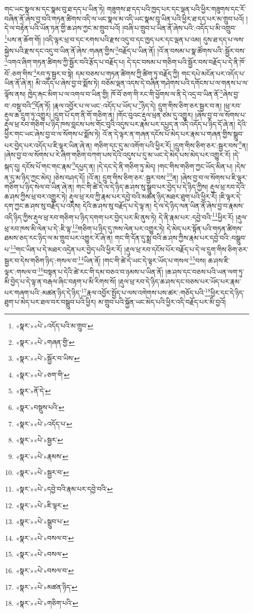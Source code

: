 གང་ཡང་སྣལ་མ་དང་སྣམ་བུ་ཐ་དད་པ་ཡིན་ཏེ། གཟུགས་ཐ་དད་པའི་ཁྱད་པར་དང་ལྡན་པའི་ཕྱིར་གཟུགས་དང་རོ་བཞིན་ནོ་ཞེས་བྱ་བའི་གཏན་ཚིགས་འདི་ལ་ཡང་སྣལ་མ་འདི་ཡང་སྣམ་བུ་ཡིན་པའི་ཕྱིར་ཐ་དད་པར་མ་གྲུབ་པའོ། །དེ་ལ་བརྟེན་པའི་ཡོན་ཏན་གྱི་ཆ་ཤས་ཀྱང་མ་གྲུབ་པའོ། །བཞི་པ་གྲུབ་པ་ཡིན་ནོ་ཞེས་པའི་:འདོད་པ་མི་འགྲུབ་\footnote{«སྣར་»«པེ་»འདོད་པའི་མ་གྲུབ་}པས་ན་ཆོག་གོ། །འདི་ལྟར་ཕྲ་བ་དང་རགས་པའི་རྫས་འདུ་བ་དང་ཁྱད་པར་དང་ལྡན་པ་འམ། དུས་ཐ་དད་པ་ལས་སྐྱེས་པའི་རྫས་དང་འདུ་བ་ཡིན་ནོ་ཞེས་:གཞན་གྱིས་\footnote{«སྣར་»«པེ་»གཞན་གྱི་}བརྗོད་པ་ཡིན་ནོ། །འོ་ན་བསམ་པ་སྣ་ཚོགས་པའི་:སྦྱོར་བས་\footnote{«སྣར་»«པེ་»སྦྱོར་བ་ཡིས་}འགའ་ཞིག་གཏན་ཚིགས་ཀྱི་སྦྱོར་བའི་རྩོད་པ་བརྗོད་པ། དེ་དང་བསམ་པ་གཅིག་པའི་སྦྱོར་བས་བརྗོད་པ་དེ་ནི་ཁོ་བོ་:ཅག་གིས་\footnote{«སྣར་»«པེ་»ཅག་གི་}རབ་ཏུ་སྦྱར་བ་སྟེ། དམ་བཅས་པ་གཏན་ཚིགས་ཀྱི་ཚིག་ཏུ་བརྗོད་ཀྱི། གང་དཔེ་མངོན་པར་འདོད་པ་ཡིན་ནོ་ཞེ་ན། མི་འདོད་པ་ཞེས་བྱ་བ་སྨོས་ཏེ། བཅོམ་ལྡན་འདས་དེ་བཞིན་གཤེགས་པའི་དགོངས་པ་ལ་གནས་པ་ལ་ལྟོས་ནས། ཁྱེད་རྐང་མིག་པ་ལ་འགལ་བ་ཡིན་གྱི། ཁོ་བོ་ཅག་གི་རང་གི་ཕྱོགས་ལ་ནི་དེ་འདྲ་བ་ཡིན་ནོ་\footnote{«སྣར་»ནོ་དེ་}ཞེས་བྱ་བ་:བསྡུ་བའི་\footnote{«སྣར་»བསྡུས་པའི་}དོན་ཏོ། །རྣལ་འབྱོར་པ་ལ་ཡང་:འདོད་པ་ཡོད་པ་\footnote{«སྣར་»«པེ་»འདོད་པ་}ཉིད་དེ། དྲུག་གིས་ཅིག་ཅར་སྦྱར་བ་ན། །ཕྲ་རབ་རྡུལ་ཆ་དྲུག་ཏུ་འགྱུར། །དྲུག་པོ་དག་ནི་གོ་གཅིག་ན། །གོང་བུའང་རྡུལ་ཕྲན་ཙམ་དུ་འགྱུར། །ཞེས་བྱ་བ་ལ་སོགས་པ་རྡུལ་ཕྲ་རབ་གཅིག་པ་ཉིད་ཁས་བླངས་པས་གོང་བུའི་འདུས་པར་རྣམ་པར་དཔྱད་ན་འདི་འདོད་པ་ཉིད་དོ་ཞེ་ན། དེའི་ཕྱིར་གང་ཡང་ཞེས་བྱ་བ་ལ་སོགས་པ་སྨོས་ཏེ། འོ་ན་དེ་ལྟར་ན་གཞན་དངོས་པོ་མེད་པར་རྣམ་པ་གཞན་གྱིས་སྒྲུབ་པར་བྱེད་པར་འདོད་པ་ཇི་ལྟར་ཡིན་ཞེ་ན། གཅིག་དང་དུ་མ་འགོག་པའི་ཕྱིར་རོ། །དྲུག་གིས་ཅིག་ཅར་:སྦྱར་བས་\footnote{«སྣར་»«པེ་»སྦྱར་}ན། །ཞེས་བྱ་བ་ལ་སོགས་པ་རེ་ཞིག་གཅིག་བཀག་པས་དེའི་འདུས་པ་དུ་མ་ཡང་དེ་མེད་པས་མེད་པར་འགྱུར་རོ། །དེ་སྐད་དུ། དངོས་པོ་གང་གང་རྣམ་\footnote{«སྣར་»«པེ་»རྣམས་}དཔྱད་ན། །དེ་དང་དེ་ནི་གཅིག་ཏུ་མེད། །གང་གིས་གཅིག་ཀྱང་ཡོད་མིན་པ། །དེས་ན་དུ་མ་ཉིད་ཀྱང་མེད། །ཅེས་བཤད་དོ། །འོ་ན། དྲུག་གིས་ཅིག་ཅར་:སྦྱར་བས་\footnote{«སྣར་»«པེ་»སྦྱར་བ་}ན། །ཞེས་བྱ་བ་ལ་སོགས་པ་ཇི་ལྟར་གཅིག་པ་ཉིད་སེལ་བ་ཡིན་ཞེ་ན། གང་གི་ཚེ་དེ་ལ་དེ་ཉིད་ཆ་ཤས་སུ་སྒྲུབ་པར་བྱེད་པ་དེ་ཉིད་ཀྱིས། རྡུལ་ཕྲ་རབ་དེའི་ཆ་ཤས་ཀྱིས་ཕྲ་བར་འགྱུར་ཏེ། རྡུལ་ཕྲ་རབ་ཀྱི་རྣམ་པར་དབྱེ་བའི་མཚན་ཉིད་མཐར་ཐུག་པའི་ཕྱིར་རོ། །ཇི་ལྟར་དེ་དག་ཀྱང་ཆ་ཤས་སུ་བརྗོད་པ་འདིས། དེའི་ཆ་ཤས་སུ་བརྗོད་པ་དེ་ལྟ་ན། དེ་ལ་དེ་ཉིད་ལན་ཡིན་ནོ་ཞེས་བྱ་བ་རྣམས་འདི་ཉིད་ཀྱིས་རྡུལ་ཕྲ་རབ་གཅིག་པ་ཉིད་དགག་པར་བྱེད་པར་མི་ནུས་ཏེ། དེ་ནི་རྣམ་པར་:དབྱེ་བའི་\footnote{«སྣར་»«པེ་»དབྱེ་བའི་རྣམ་པར་དབྱེ་བའི་}ཕྱིར་རོ། །རྡུལ་ཕྲ་རབ་ཁས་མི་ལེན་པ་དེ་:ཇི་ལྟ་\footnote{«སྣར་»«པེ་»ཇི་ལྟར་}གཅིག་པ་ཉིད་དུ་ཁས་ལེན་པར་འགྱུར་ཏེ། དེ་མེད་པར་སྟོན་པའི་གཏན་ཚིགས་ཐམས་ཅད་རང་ཉིད་ལ་མ་གྲུབ་པར་འགྱུར་རོ་ཞེ་ན། གང་གི་དོན་དུ་སྨྲ་བའི་ཆ་ཤས་ཀྱིས་རྣམ་པར་དབྱེ་བའི་:བསྒྲུབ་པ་\footnote{«སྣར་»«པེ་»སྒྲུབ་པ་}གང་ཡིན་པ་དེ་མཐར་འདྲེན་པར་བྱེད་པའི་ཕྱིར་རོ། །རྡུལ་ཕྲ་རབ་དངོས་པོར་བརྗོད་པ་དེ་ལ་དྲུག་གིས་ཅིག་ཅར་སྦྱར་བ་དེས་གཅིག་ཉིད་:གསལ་བ་\footnote{«སྣར་»«པེ་»བསལ་བ་}ཡིན་ནོ། །གང་གི་ཚེ་དེ་ཡང་དེ་ལྟར་ཡོད་པ་གསལ་\footnote{«སྣར་»«པེ་»བསལ་}བས། ཆ་ཤས་ཇི་ལྟར་:གསལ་བ་\footnote{«སྣར་»«པེ་»བསལ་བ་}བསྟན་པ་དེའི་ཚེ་རང་གི་དམ་བཅའ་བ་ཉམས་པ་ཡིན་ནོ། །ཆ་ཤས་དང་བཅས་པའི་ཡན་ལག་ཏུ་མི་བྱེད་པ་དེ་ལྟ་ན་བརྒལ་ཞིང་བརྟག་པ་མི་རིགས་སོ། །རྡུལ་ཕྲ་རབ་དེ་ཉིད་ཆ་ཤས་དང་བཅས་པར་ཡོད་པར་རྣམ་པར་གཞག་པའི་:མཚན་ཉིད་དེ་ཉིད་\footnote{«སྣར་»«པེ་»མཚན་ཉིད་}རྣལ་འབྱོར་སྤྱོད་པ་ལས་འགེགས་པས་ཚར་:གཅོད་པའི་\footnote{«སྣར་»«པེ་»གཅིག་པའི་}ཕྱིར་དང་དེ་ཉིད་ཐུག་པ་མེད་པར་ཐལ་བར་བསྒྲུབ་པའི་ཕྱིར། མ་གྲུབ་པའི་སྐྱོན་ཡང་མེད་པའི་ཕྱིར་འདི་བརྗོད་པར་མི་བྱའོ། 